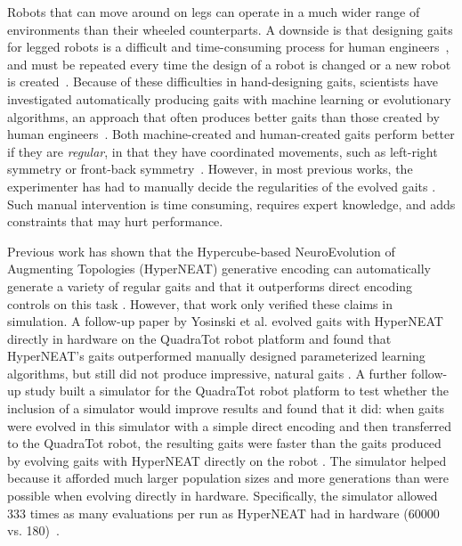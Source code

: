 Robots that can move around on legs can operate in a much wider range of environments than their wheeled counterparts. A downside is that designing gaits for legged robots is a difficult and time-consuming process for human engineers~\cite{strom1999legged,wettergreen1992gait}, and must be repeated every time the design of a robot is changed or a new robot is created~\cite{hornby2005autonomous}. 
Because of these difficulties in hand-designing gaits, scientists have investigated automatically producing gaits with machine learning or evolutionary algorithms, an approach that often produces better gaits than those created by human engineers~\cite{valsalam:mii,kohl:stone,hornby2005autonomous,hornby2003generative,yos:clune}. Both machine-created and human-created gaits perform better if they are \emph{regular}, in that they have coordinated movements, such as left-right symmetry or front-back symmetry~\cite{valsalam:mii,clune2011performance,clune2009evolving,clune2009sensitivity}.
However, in most previous works, the experimenter has had to manually decide the regularities of the evolved gaits \cite{valsalam:mii,tellez,beer,raibert}. 
Such manual intervention is time consuming, requires expert knowledge, and adds constraints that may hurt performance. 

Previous work has shown that the Hypercube-based NeuroEvolution of Augmenting Topologies (HyperNEAT) generative encoding \cite{stanley2009hypercube} can automatically generate a variety of regular gaits and that it outperforms direct encoding controls on this task \cite{clune2009evolving,clune2011performance}.
However, that work only verified these claims in simulation. 
A follow-up paper by Yosinski et al. evolved gaits with HyperNEAT directly in hardware on the QuadraTot robot platform and found that HyperNEAT's gaits outperformed manually designed parameterized learning algorithms, but still did not produce impressive, natural gaits \cite{yos:clune}. 
A further follow-up study built a simulator for the QuadraTot robot platform to test whether the inclusion of a simulator would improve results and found that it did:  when gaits were evolved in this simulator with a simple direct encoding and then transferred to the QuadraTot robot, the resulting gaits were faster than the gaits produced by evolving gaits with HyperNEAT directly on the robot \cite{glette}. 
The simulator helped because it afforded much larger population sizes and more generations than were possible when evolving directly in hardware. Specifically, the simulator allowed 333 times as many evaluations per run as HyperNEAT had in hardware (60000 vs. 180)~\cite{yos:clune,glette}. 

